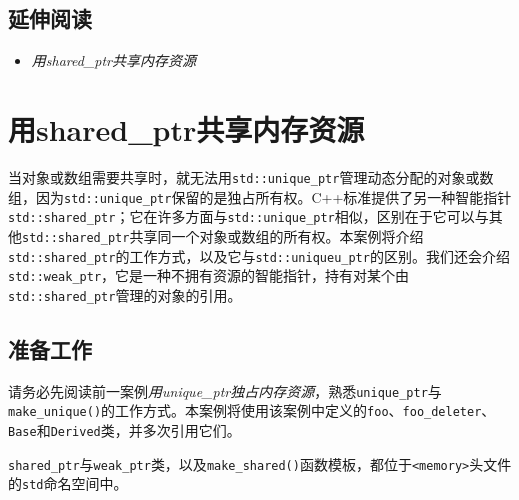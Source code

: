 
\subsection{延伸阅读}



\begin{itemize}
\item \textit{用shared\_ptr共享内存资源}

\end{itemize}



\section{用shared\_ptr共享内存资源}



当对象或数组需要共享时，就无法用\texttt{std::\allowbreak{}unique\_\allowbreak{}ptr}管理动态分配的对象或数组，因为\texttt{std::\allowbreak{}unique\_\allowbreak{}ptr}保留的是独占所有权。C++标准提供了另一种智能指针\texttt{std::\allowbreak{}shared\_\allowbreak{}ptr}；它在许多方面与\texttt{std::\allowbreak{}unique\_\allowbreak{}ptr}相似，区别在于它可以与其他\texttt{std::\allowbreak{}shared\_\allowbreak{}ptr}共享同一个对象或数组的所有权。本案例将介绍\texttt{std::\allowbreak{}shared\_\allowbreak{}ptr}的工作方式，以及它与\texttt{std::\allowbreak{}uniqueu\_\allowbreak{}ptr}的区别。我们还会介绍\texttt{std::\allowbreak{}weak\_\allowbreak{}ptr}，它是一种不拥有资源的智能指针，持有对某个由\texttt{std::\allowbreak{}shared\_\allowbreak{}ptr}管理的对象的引用。



\subsection{准备工作}



请务必先阅读前一案例\textit{用unique\_ptr独占内存资源}，熟悉\texttt{unique\_\allowbreak{}ptr}与\texttt{make\_\allowbreak{}unique()}的工作方式。本案例将使用该案例中定义的\texttt{foo}、\texttt{foo\_\allowbreak{}deleter}、\texttt{Base}和\texttt{Derived}类，并多次引用它们。



\texttt{shared\_\allowbreak{}ptr}与\texttt{weak\_\allowbreak{}ptr}类，以及\texttt{make\_\allowbreak{}shared()}函数模板，都位于\texttt{<\allowbreak{}memory>}头文件的\texttt{std}命名空间中。


